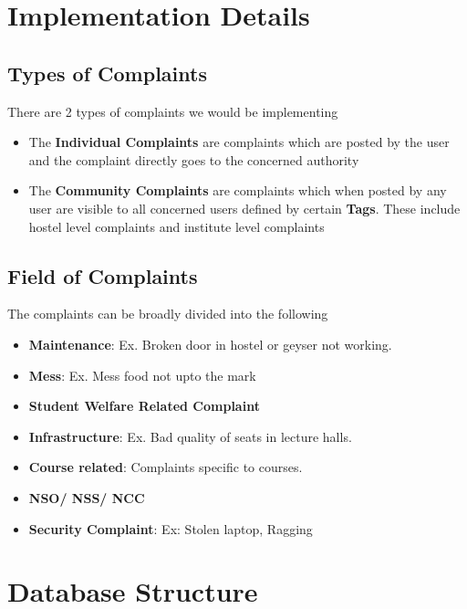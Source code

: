 \documentclass{article}
\begin{document}
\section{Implementation Details}
    \begin{addmargin}[1em]{2em}
    \subsection{Types of Complaints}
        There are 2 types of complaints we would be implementing
        \begin{itemize}
            \item The \textbf{Individual Complaints} are complaints which are posted by the user and the complaint directly goes to the concerned authority
            \item The \textbf{Community Complaints} are complaints which when posted by any user are visible to all concerned users defined by certain \textbf{Tags}. These include hostel level complaints and institute level complaints
        \end{itemize}
    \end{addmargin}    
    \begin{addmargin}[1em]{2em}
    \subsection{Field of Complaints}
        The complaints can be broadly divided into the following
        \begin{itemize}
            \item \textbf{Maintenance}: Ex. Broken door in hostel or geyser not working.
            \item \textbf{Mess}: Ex. Mess food not upto the mark
            \item \textbf{Student Welfare Related Complaint} 
            \item \textbf{Infrastructure}: Ex. Bad quality of seats in lecture halls.
            \item \textbf{Course related}: Complaints specific to courses.
            \item \textbf{NSO/ NSS/ NCC}
            \item \textbf{Security Complaint}: Ex: Stolen laptop, Ragging
        \end{itemize}
    \end{addmargin}

\section{Database Structure}
\end{document}

